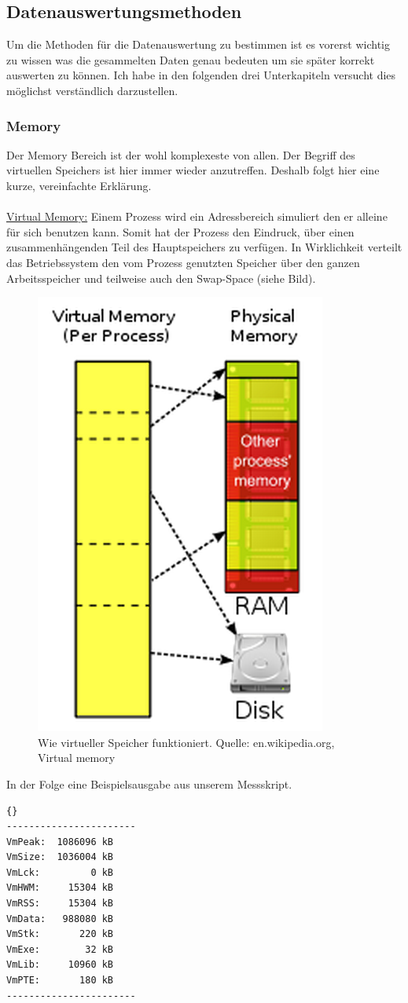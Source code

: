 \documentclass{fancydocument}
\begin{document}
\subsection{Datenauswertungsmethoden}

Um die Methoden für die Datenauswertung zu bestimmen ist es vorerst wichtig zu wissen was die gesammelten Daten genau bedeuten um sie später korrekt auswerten zu können. Ich habe in den folgenden drei Unterkapiteln versucht dies möglichst verständlich darzustellen.

\subsubsection{Memory}
Der Memory Bereich ist der wohl komplexeste von allen. Der Begriff des virtuellen Speichers ist hier immer wieder anzutreffen. Deshalb folgt hier eine kurze, vereinfachte Erklärung.
\\\\
\underline{Virtual Memory:} Einem Prozess wird ein Adressbereich simuliert den er alleine für sich benutzen kann. Somit hat der Prozess den Eindruck, über einen zusammenhängenden Teil des Hauptspeichers zu verfügen. In Wirklichkeit verteilt das Betriebssystem den vom Prozess genutzten Speicher über den ganzen Arbeitsspeicher und teilweise auch den Swap-Space (siehe Bild).
\begin{figure}[h!]
\begin{center}
\includegraphics[width=0.3\linewidth]{bilder/virtualmemory.png}
\caption{Wie virtueller Speicher funktioniert. Quelle: en.wikipedia.org, Virtual memory}
\end{center}
\end{figure}

\noindent
In der Folge eine Beispielsausgabe aus unserem Messskript.

\begin{minipage}{\textwidth}
\begin{lstlisting}[language=bash,caption=Speicherdaten]{}
-----------------------
VmPeak:	 1086096 kB
VmSize:	 1036004 kB
VmLck:	       0 kB
VmHWM:	   15304 kB
VmRSS:	   15304 kB
VmData:	  988080 kB
VmStk:	     220 kB
VmExe:	      32 kB
VmLib:	   10960 kB
VmPTE:	     180 kB
-----------------------
\end{lstlisting}
\end{minipage}
\end{document}
